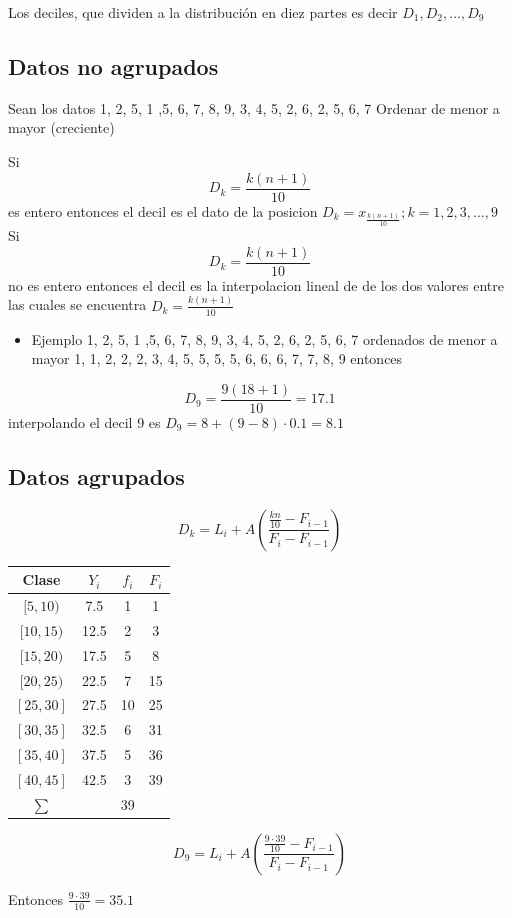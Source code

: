 \documentclass[10pt,]{krantz}
\providecommand{\tightlist}{%
  \setlength{\itemsep}{0pt}\setlength{\parskip}{0pt}}
\theoremstyle{definition}
\theoremstyle{definition}
\theoremstyle{definition}
\theoremstyle{definition}
\theoremstyle{remark}
\begin{document}
Los deciles, que dividen a la distribución en diez partes es decir \(D_1, D_2,\ldots, D_9\)

\hypertarget{datos-no-agrupados-1}{%
\subsection{Datos no agrupados}\label{datos-no-agrupados-1}}

Sean los datos 1, 2, 5, 1 ,5, 6, 7, 8, 9, 3, 4, 5, 2, 6, 2, 5, 6, 7 Ordenar de menor a mayor (creciente)

Si \[D_k=\frac{k(n+1)}{10}\] es entero entonces el decil es el dato de la posicion \(D_k=x_\frac{k(n+1)}{10}; k=1, 2, 3, \ldots, 9\) Si \[D_k=\frac{k(n+1)}{10}\] no es entero entonces el decil es la interpolacion lineal de de los dos valores entre las cuales se encuentra \(D_k=\frac{k(n+1)}{10}\)

\begin{itemize}
\tightlist
\item
  Ejemplo 1, 2, 5, 1 ,5, 6, 7, 8, 9, 3, 4, 5, 2, 6, 2, 5, 6, 7 ordenados de menor a mayor 1, 1, 2, 2, 2, 3, 4, 5, 5, 5, 5, 6, 6, 6, 7, 7, 8, 9 entonces
\end{itemize}

\[D_9=\frac{9(18+1)}{10}=17.1\] interpolando el decil 9 es \(D_9=8+(9-8)\cdot 0.1=8.1\)

\hypertarget{datos-agrupados-1}{%
\subsection{Datos agrupados}\label{datos-agrupados-1}}

\[D_k=L_i+ A\left(\frac{\frac{kn}{10}-F_{i-1}}{F_i-F_{i-1}}\right)\]

\begin{longtable}[]{@{}cccc@{}}
\toprule
Clase & \(Y_i\) & \(f_i\) & \(F_i\)\tabularnewline
\midrule
\endhead
\([5,10)\) & 7.5 & 1 & 1\tabularnewline
\([10,15)\) & 12.5 & 2 & 3\tabularnewline
\([15,20)\) & 17.5 & 5 & 8\tabularnewline
\([20,25)\) & 22.5 & 7 & 15\tabularnewline
\([25,30]\) & 27.5 & 10 & 25\tabularnewline
\([30,35]\) & 32.5 & 6 & 31\tabularnewline
\([35,40]\) & 37.5 & 5 & 36\tabularnewline
\([40,45]\) & 42.5 & 3 & 39\tabularnewline
\(\sum\) & & 39 &\tabularnewline
\bottomrule
\end{longtable}

\[D_9=L_i+ A\left(\frac{\frac{9\cdot 39}{10}-F_{i-1}}{F_i-F_{i-1}}\right)\]

Entonces \(\frac{9\cdot 39}{10}=35.1\)
\end{document}
